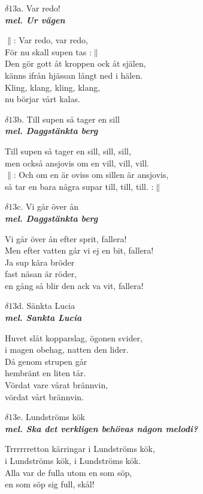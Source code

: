 \documentclass[a6paper,10pt]{article}
\newcommand{\mel}[1]{\small\textbf{\textit{mel. #1 \\}}}
\begin{document}
\setlength{\oddsidemargin}{-0.37in}
\noindent
\begin{center}
\Large $\delta13$a. Var redo!\\ 
\mel{Ur vägen}
\end{center}
$\|$: Var redo, var redo, \\
För nu skall supen tas :$\|$\\
Den gör gott åt kroppen ock åt själen, \\
känns ifrån hjässan långt ned i hälen. \\
Kling, klang, kling, klang, \\
nu börjar vårt kalas. 
\vspace{20pt}
\begin{center}
\Large $\delta13$b. Till supen så tager en sill\\ 
\mel{Daggstänkta berg}
\end{center}
Till supen så tager en sill, sill, sill, \\
men också ansjovis om en vill, vill, vill. \\
$\|$: Och om en är oviss om sillen är ansjovis, \\
så tar en bara några supar till, till, till. :$\|$
\vspace{20pt}
\begin{center}
\Large $\delta13$c. Vi går över ån\\ 
\mel{Daggstänkta berg}
\end{center}
Vi går över ån efter sprit, fallera!\\
Men efter vatten går vi ej en bit, fallera!\\
Ja sup kära bröder\\
fast näsan är röder,\\
en gång så blir den ack va vit, fallera!

\newpage
\setlength{\oddsidemargin}{-0.47in}
\noindent
\begin{center}
\Large $\delta13$d. Sänkta Lucia\\ 
\mel{Sankta Lucia}
\end{center}
Huvet slåt kopparslag, ögonen svider,\\
i magen obehag, natten den lider.\\
Då genom strupen går\\
hembränt en liten tår.\\
Vördat vare vårat brännvin,\\
vördat vårt brännvin.
\vspace{40pt}
\begin{center}
\Large $\delta13$e. Lundströms kök\\ 
\mel{Ska det verkligen behövas någon melodi?}
\end{center}
Trrrrrretton kärringar i Lundströms kök, \\
i Lundströms kök, i Lundströms kök. \\
Alla var de fulla utom en som söp, \\
en som söp sig full, skål! 
\end{document}
